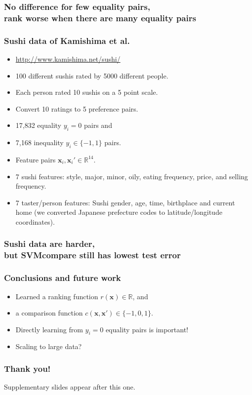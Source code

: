 \documentclass{beamer}
\newcommand{\RR}{\mathbb R}
\begin{document}
\begin{frame}
  \frametitle{No difference for few equality pairs,\\
    rank worse when there are many equality pairs}
  \begin{minipage}{1.0\linewidth}
    \hskip -0.5cm
      
  \end{minipage}
\end{frame}

\begin{frame}
  \frametitle{Sushi data of Kamishima et al.}
  \begin{itemize}
  \item  \url{http://www.kamishima.net/sushi/}
  \item 100 different sushis rated by 5000 different people.
  \item Each person rated 10 sushis on a 5 point scale. 
  \item Convert 10 ratings to 5 preference pairs.
  \item 17,832 equality $y_i=0$ pairs and
  \item 7,168 inequality $y_i\in\{-1,1\}$ pairs.
  \item Feature pairs $\mathbf x_i,\mathbf x_i'\in\RR^{14}$.
  \item 7 sushi features: style, major, minor, oily, eating frequency,
    price, and selling frequency.
  \item 7 taster/person features: Sushi gender, age, time, birthplace
    and current home (we converted Japanese prefecture codes to
    latitude/longitude coordinates).
  \end{itemize}
\end{frame}

\begin{frame}
  \frametitle{Sushi data are harder,\\
    but SVMcompare still has lowest test error}
  \begin{minipage}{1.0\linewidth}
    \hskip -1cm
      
  \end{minipage}
\end{frame}

\begin{frame}
  \frametitle{Conclusions and future work}
  \begin{itemize}
  \item Learned a ranking function $r(\mathbf x)\in\RR$, and
  \item a comparison function $c(\mathbf x, \mathbf x')\in\{-1,0,1\}$.
  \item Directly learning from $y_i=0$ equality pairs is important!
  \item Scaling to large data?
  \end{itemize}
\end{frame}

\begin{frame}
  \frametitle{Thank you!}
  Supplementary slides appear after this one.
\end{frame}
\end{document}
